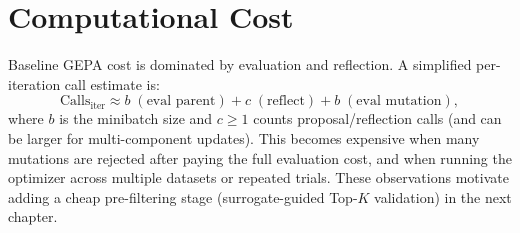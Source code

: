 \section{Computational Cost}
Baseline GEPA cost is dominated by evaluation and reflection. A simplified per-iteration call estimate is:
\[
\text{Calls}_{\text{iter}} \approx b \;(\text{eval parent}) + c \;(\text{reflect}) + b \;(\text{eval mutation}),
\]
where $b$ is the minibatch size and $c \ge 1$ counts proposal/reflection calls (and can be larger for multi-component updates). This becomes expensive when many mutations are rejected after paying the full evaluation cost, and when running the optimizer across multiple datasets or repeated trials. These observations motivate adding a cheap pre-filtering stage (surrogate-guided Top-$K$ validation) in the next chapter. \citep{agrawal2025gepa,gepa_repo}